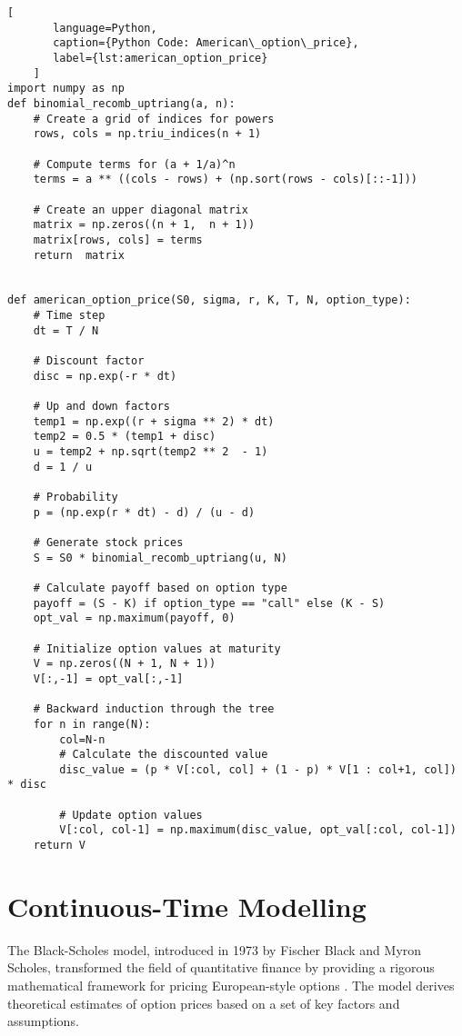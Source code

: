     \begin{lstlisting}[
       language=Python,
       caption={Python Code: American\_option\_price},
       label={lst:american_option_price}
    ]
import numpy as np
def binomial_recomb_uptriang(a, n):
    # Create a grid of indices for powers
    rows, cols = np.triu_indices(n + 1)

    # Compute terms for (a + 1/a)^n
    terms = a ** ((cols - rows) + (np.sort(rows - cols)[::-1]))

    # Create an upper diagonal matrix
    matrix = np.zeros((n + 1,  n + 1))
    matrix[rows, cols] = terms
    return  matrix


def american_option_price(S0, sigma, r, K, T, N, option_type):
    # Time step
    dt = T / N

    # Discount factor
    disc = np.exp(-r * dt)

    # Up and down factors
    temp1 = np.exp((r + sigma ** 2) * dt)
    temp2 = 0.5 * (temp1 + disc)
    u = temp2 + np.sqrt(temp2 ** 2  - 1)
    d = 1 / u

    # Probability
    p = (np.exp(r * dt) - d) / (u - d)

    # Generate stock prices
    S = S0 * binomial_recomb_uptriang(u, N)

    # Calculate payoff based on option type
    payoff = (S - K) if option_type == "call" else (K - S)
    opt_val = np.maximum(payoff, 0)

    # Initialize option values at maturity
    V = np.zeros((N + 1, N + 1))
    V[:,-1] = opt_val[:,-1]

    # Backward induction through the tree
    for n in range(N):
        col=N-n
        # Calculate the discounted value
        disc_value = (p * V[:col, col] + (1 - p) * V[1 : col+1, col]) * disc

        # Update option values
        V[:col, col-1] = np.maximum(disc_value, opt_val[:col, col-1])
    return V
   \end{lstlisting}


\section{Continuous-Time Modelling}
    \label{sec:cont_time}


    The Black-Scholes model, introduced in 1973 by Fischer Black and Myron Scholes,
    transformed the field of quantitative finance by providing a rigorous mathematical framework for pricing European-style options \cite{black_pricing_1973}. The model derives theoretical estimates of option prices based on a set of key factors and assumptions.


